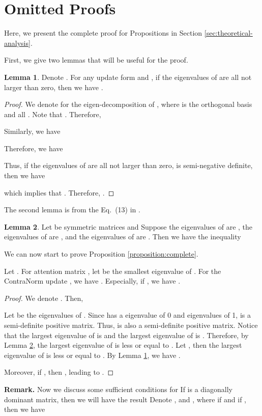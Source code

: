 \documentclass{article}
\theoremstyle{definition}
\newenvironment{manualproposition}[1]{\renewcommand\themanualtheoreminner{#1}\manualtheoreminner
}{\endmanualtheoreminner}
\newtheorem{lemma}{Lemma}[section]
\theoremstyle{remark}
\theoremstyle{theorem}
\begin{document}
\section{Omitted Proofs} \label{appen:proof}
Here, we present the complete proof for Propositions in Section \ref{sec:theoretical-analysis}.

First, we give two lemmas that will be useful for the proof.
\begin{lemma}
    Denote . For any update form  and , if the eigenvalues of  are all not larger than zero, then we have . \label{lemma1}
\end{lemma}
\begin{proof}
    We denote  for the eigen-decomposition of , where  is the orthogonal basis and all . Note that . Therefore,
    
    Similarly, we have
    
    Therefore, we have
    
    Thus, if the eigenvalues of  are all not larger than zero,  is semi-negative definite, then we have
    
    which implies that . Therefore, . 
\end{proof}
The second lemma is from the Eq.~(13) in \cite{eigenvalue}.
\begin{lemma}
    Let  be symmetric matrices and  Suppose the eigenvalues of  are  , the eigenvalues of  are  , and the eigenvalues of  are . Then we have the inequality
    \label{lemma2}
\end{lemma}
We can now start to prove Proposition \ref{proposition:complete}.
\begin{manualproposition}{1}
   Let . For attention matrix , let  be the smallest eigenvalue of  . For the ContraNorm update , we have . Especially, if , we have .
\end{manualproposition}
\begin{proof}
    We denote . Then,
    
    Let  be the eigenvalues of . Since  has a eigenvalue of 0 and  eigenvalues of 1,  is a semi-definite positive matrix. Thus,  is also a semi-definite positive matrix. Notice that the largest eigenvalue of  is  and the largest eigenvalue of  is . Therefore, by Lemma \ref{lemma2}, the largest eigenvalue of  is less or equal to . Let , then the largest eigenvalue of  is less or equal to . By Lemma \ref{lemma1}, we have .
    
    Moreover, if , then , leading to .
\end{proof}
\textbf{Remark.} Now we discuss some sufficient conditions for  If  is a diagonally dominant matrix, then we will have the result  Denote ,  and , where  if  and  if , then we have
\end{document}
